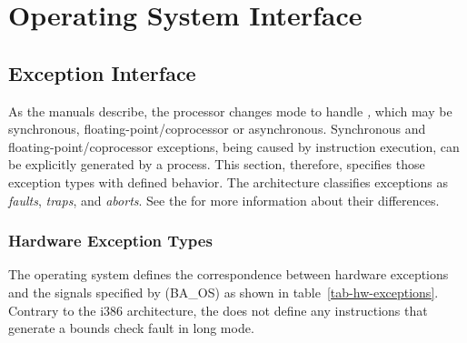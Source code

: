 \section{Operating System Interface}

\subsection{Exception Interface}

As the \xARCH manuals describe, the processor changes mode to handle
\emph{,} which may be synchronous,
floating-point/coprocessor or asynchronous.
Synchronous and floating-point/coprocessor exceptions,
being caused by instruction execution, can be explicitly generated
by a process. This section, therefore, specifies those exception types
with defined behavior. The \xARCH architecture classifies exceptions as
\emph{faults}, \emph{traps}, and \emph{aborts}. See the \intelabi
for more information about their differences.

\subsubsection{Hardware Exception Types}
The operating system defines the correspondence between hardware
exceptions and the signals specified by (BA\_OS)
as shown in table~\ref{tab-hw-exceptions}. Contrary to the i386
architecture, the \xARCH does not define any instructions that
generate a bounds check fault in long mode.

